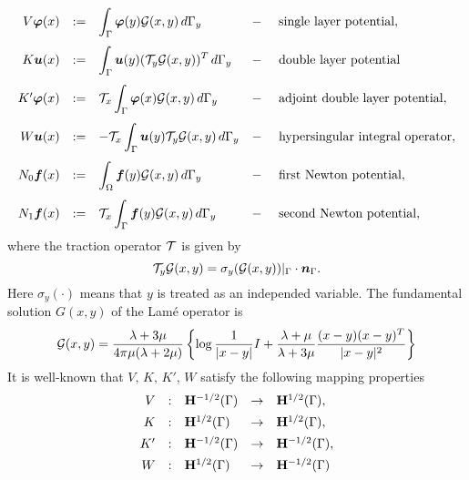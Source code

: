 \documentclass[12pt,a4paper]{scrbook}
\begin{document}
\newpage
\begin{equation}\nonumber
\begin{array}{rclcl}
  V\mbox{\boldmath$\varphi$}(x)&:=&\displaystyle\int_\Gamma \mbox{\boldmath$\varphi$}(y)\mathcal{G}(x,y)\,d\Gamma_y       &-&\mbox{ single layer potential},\\[3ex]
  K\mbox{\boldmath$u$}(x)&:=&\displaystyle\int_\Gamma \mbox{\boldmath$u$}(y) ({\mathcal T}_y \mathcal{G}(x,y))^T\,d\Gamma_y        &-&\mbox{ double layer potential}\\[3ex]
  K'\mbox{\boldmath$\varphi$}(x)&:=&\displaystyle{\mathcal T}_x\int_\Gamma\mbox{\boldmath$\varphi$}(x)\mathcal{G}(x,y)\,d\Gamma_y  &-&\mbox{ adjoint double layer potential},\\[3ex]
  W\mbox{\boldmath$u$}(x)&:=&\displaystyle-{\mathcal T}_x\int_\Gamma \mbox{\boldmath$u$}(y) {\mathcal T}_y \mathcal{G}(x,y)\,d\Gamma_y      &-&\mbox{ hypersingular integral operator},\\[3ex]
  N_0 \mbox{\boldmath$f$}(x)&:=&\displaystyle\int_\Omega \mbox{\boldmath$f$}(y) \mathcal{G}(x,y)\,d\Gamma_y              &-&\mbox{ first Newton potential},\\[3ex]
  N_1 \mbox{\boldmath$f$}(x)&:=&\displaystyle {\mathcal T}_x \int_\Gamma \mbox{\boldmath$f$}(y) \mathcal{G}(x,y)\,d\Gamma_y        &-&\mbox{ second Newton potential},
\end{array}
\end{equation}
where the traction operator ${\mathcal T}$ is given by
\begin{equation*}
{\mathcal T}_y  \mathcal{G}(x,y) = \sigma_y( \mathcal{G}(x,y))|_{\Gamma} \cdot \mbox{\boldmath$n$}_{\Gamma}.
\end{equation*}
Here $\sigma_y(\cdot)$ means that $y$ is treated as an independed variable.
The fundamental solution $G(x,y)$ of the Lam\'e operator is
\begin{equation}\label{eq:LameFundamentalSolution}
\mathcal{G}(x,y)=\frac{\lambda+3\mu}{4\pi\mu(\lambda+2\mu)}
\left\{\log \frac{1}{|x-y|}I+\frac{\lambda+\mu}{\lambda+3\mu}
  \frac{(x-y)(x-y)^T}{|x-y|^2}\right\}
\end{equation}
It is well-known \cite{Cos88} that $V,\,K,\,K',\,W$ satisfy the following mapping properties
\begin{eqnarray*}
\begin{array}{rclrl}
V&:& \mathbf{H}^{-1/2}(\Gamma)&\rightarrow& \mathbf{H}^{1/2}(\Gamma),\\[1ex]
K&:&\mathbf{H}^{1/2}(\Gamma)&\rightarrow& \mathbf{H}^{1/2}(\Gamma),\\[1ex]
K'&:&\mathbf{H}^{-1/2}(\Gamma)&\rightarrow& \mathbf{H}^{-1/2}(\Gamma),\\[1ex]
W&:&\mathbf{H}^{1/2}(\Gamma)&\rightarrow& \mathbf{H}^{-1/2}(\Gamma)
\end{array}
\end{eqnarray*}
\end{document}
